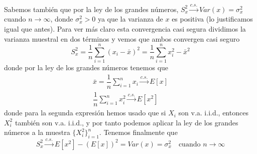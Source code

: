 \noindent
Sabemos también que por la ley de los grandes números, $S_x^2 \xrightarrow{c.s.} Var(x)=\sigma_x^2$ cuando $n\to \infty$, donde $\sigma_x^2>0$ ya que la varianza de $x$ es positiva (lo justificamos igual que antes). Para ver más claro esta convergencia casi segura dividimos la varianza muestral en dos términos y vemos que ambos convergen casi seguro
\begin{equation*}
    S_x^2 = \dfrac{1}{n} \sum\limits_{i=1}^{n} (x_i - \bar{x})^2 = \dfrac{1}{n} \sum\limits_{i=1}^{n} x_i^2 - \bar{x}^2
\end{equation*}
donde por la ley de los grandes números tenemos que 
\begin{align*}
    \bar{x} = \dfrac{1}{n} \sum\limits_{i=1}^{n} x_i \xrightarrow{c.s.} E[x] \\
    \dfrac{1}{n} \sum\limits_{i=1}^{n} x_i^2 \xrightarrow{c.s.} E[x^2]
\end{align*}
donde para la segunda expresión hemos usado que si $X_i$ son v.a. i.i.d., entonces $X_i^2$ también son v.a. i.i.d., y por tanto podemos aplicar la ley de los grandes números a la muestra $\{X_i^2\}_{i=1}^{n}$. Tenemos finalmente que 
\begin{equation*}
    S_x^2 \xrightarrow{c.s.} E[x^2] - (E[x])^2 = Var(x) = \sigma_x^2 \quad  \text{cuando } n\to \infty
\end{equation*}


